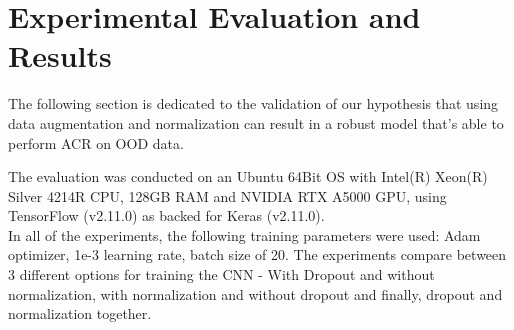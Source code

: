\documentclass[a4paper]{article}
\begin{document}


\section{Experimental Evaluation and Results} \label{sec:experiments}
The following section is dedicated to the validation of
our hypothesis that using data augmentation and normalization can result in a robust model that's able to perform ACR on OOD data.

\noindent The evaluation was conducted on an Ubuntu 64Bit OS with Intel(R) Xeon(R) Silver 4214R CPU, 128GB RAM and NVIDIA RTX A5000 GPU, using TensorFlow (v2.11.0) as backed for Keras (v2.11.0).
\\
\noindent In all of the experiments, the following training parameters
were used: Adam \cite{kingma2017adam} optimizer, 1e-3 learning rate, batch size of 20.
The experiments compare between 3 different options for training the CNN - With Dropout and without normalization, with normalization and without dropout and finally, dropout and normalization together.
\end{document}
